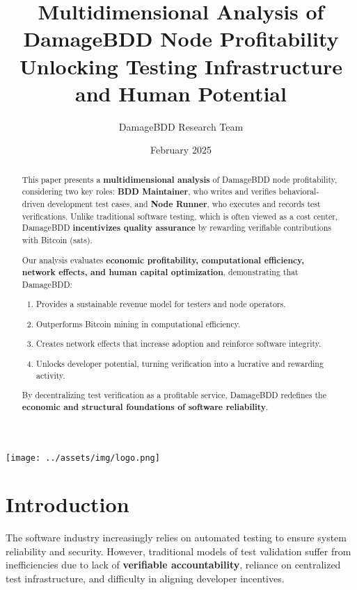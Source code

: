 \documentclass[a4paper,12pt]{article}
\title{\textbf{Multidimensional Analysis of DamageBDD Node Profitability} \\ Unlocking Testing Infrastructure and Human Potential}
\author{DamageBDD Research Team}
\date{February 2025}
\begin{document}
\begin{titlepage}
    \centering
    \texttt{[image: ../assets/img/logo.png]}
    \vfill
    \maketitle
    \thispagestyle{empty}
\end{titlepage}

\begin{abstract}
    This paper presents a \textbf{multidimensional analysis} of DamageBDD node profitability, considering two key roles: \textbf{BDD Maintainer}, who writes and verifies behavioral-driven development test cases, and \textbf{Node Runner}, who executes and records test verifications. Unlike traditional software testing, which is often viewed as a cost center, DamageBDD \textbf{incentivizes quality assurance} by rewarding verifiable contributions with Bitcoin (sats). 

    Our analysis evaluates \textbf{economic profitability, computational efficiency, network effects, and human capital optimization}, demonstrating that DamageBDD:
    \begin{enumerate}
        \item Provides a sustainable revenue model for testers and node operators.
        \item Outperforms Bitcoin mining in computational efficiency.
        \item Creates network effects that increase adoption and reinforce software integrity.
        \item Unlocks developer potential, turning verification into a lucrative and rewarding activity.
    \end{enumerate}

    By decentralizing test verification as a profitable service, DamageBDD redefines the \textbf{economic and structural foundations of software reliability}.
\end{abstract}

\newpage

\section{Introduction}
The software industry increasingly relies on automated testing to ensure system reliability and security. However, traditional models of test validation suffer from inefficiencies due to lack of \textbf{verifiable accountability}, reliance on centralized test infrastructure, and difficulty in aligning developer incentives.
\end{document}

